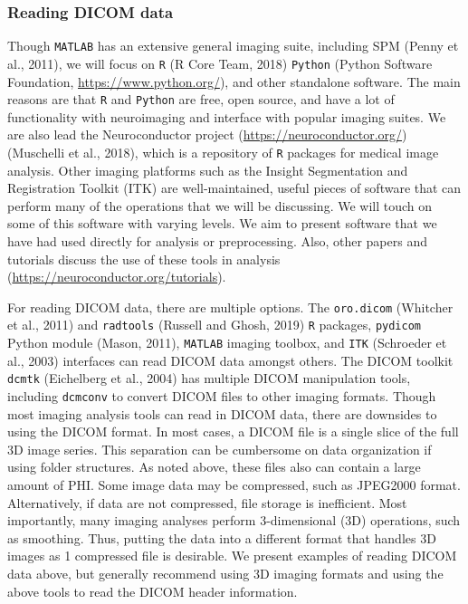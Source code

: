 \documentclass[utf8]{frontiersSCNS}
\begin{document}
\hypertarget{reading-dicom-data}{%
\subsubsection{Reading DICOM data}\label{reading-dicom-data}}

Though \texttt{MATLAB} has an extensive general imaging suite, including SPM (Penny et al., 2011), we will focus on \texttt{R} (R Core Team, 2018) \texttt{Python} (Python Software Foundation, \url{https://www.python.org/}), and other standalone software. The main reasons are that \texttt{R} and \texttt{Python} are free, open source, and have a lot of functionality with neuroimaging and interface with popular imaging suites. We are also lead the Neuroconductor project (\url{https://neuroconductor.org/}) (Muschelli et al., 2018), which is a repository of \texttt{R} packages for medical image analysis. Other imaging platforms such as the Insight Segmentation and Registration Toolkit (ITK) are well-maintained, useful pieces of software that can perform many of the operations that we will be discussing. We will touch on some of this software with varying levels. We aim to present software that we have had used directly for analysis or preprocessing. Also, other papers and tutorials discuss the use of these tools in analysis (\url{https://neuroconductor.org/tutorials}).

For reading DICOM data, there are multiple options. The \texttt{oro.dicom} (Whitcher et al., 2011) and \texttt{radtools} (Russell and Ghosh, 2019) \texttt{R} packages, \texttt{pydicom} Python module (Mason, 2011), \texttt{MATLAB} imaging toolbox, and \texttt{ITK} (Schroeder et al., 2003) interfaces can read DICOM data amongst others. The DICOM toolkit \texttt{dcmtk} (Eichelberg et al., 2004) has multiple DICOM manipulation tools, including \texttt{dcmconv} to convert DICOM files to other imaging formats. Though most imaging analysis tools can read in DICOM data, there are downsides to using the DICOM format. In most cases, a DICOM file is a single slice of the full 3D image series. This separation can be cumbersome on data organization if using folder structures. As noted above, these files also can contain a large amount of PHI. Some image data may be compressed, such as JPEG2000 format. Alternatively, if data are not compressed, file storage is inefficient. Most importantly, many imaging analyses perform 3-dimensional (3D) operations, such as smoothing. Thus, putting the data into a different format that handles 3D images as 1 compressed file is desirable. We present examples of reading DICOM data above, but generally recommend using 3D imaging formats and using the above tools to read the DICOM header information.
\end{document}
